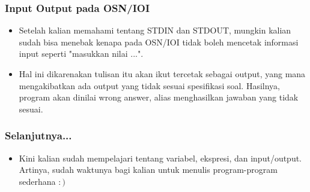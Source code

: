 \documentclass{beamer}
\begin{document}
\begin{frame}
\frametitle{Input Output pada OSN/IOI}
\begin{itemize}
	\item Setelah kalian memahami tentang STDIN dan STDOUT, mungkin kalian sudah bisa menebak kenapa pada OSN/IOI tidak boleh mencetak informasi input seperti "masukkan nilai ...".
	\item Hal ini dikarenakan tulisan itu akan ikut tercetak sebagai output, yang mana mengakibatkan ada output yang tidak sesuai spesifikasi soal. Hasilnya, program akan dinilai \alert{wrong answer}, alias menghasilkan jawaban yang tidak sesuai. 
\end{itemize}
\end{frame}

\begin{frame}
\frametitle{Selanjutnya...}
\begin{itemize}
	\item Kini kalian sudah mempelajari tentang variabel, ekspresi, dan input/output. Artinya, sudah waktunya bagi kalian untuk menulis program-program sederhana $:)$
\end{itemize}
\end{frame}
\end{document}
